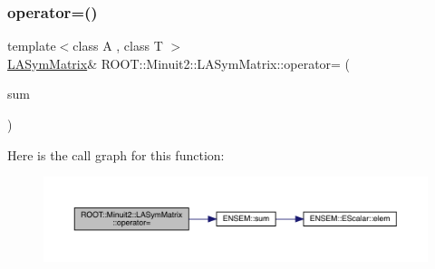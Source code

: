 \subsubsection{\texorpdfstring{operator=()}{operator=()}\hspace{0.1cm}{\footnotesize\ttfamily [9/14]}}
{\footnotesize\ttfamily template$<$class A , class T $>$ \\
\mbox{\hyperlink{classROOT_1_1Minuit2_1_1LASymMatrix}{L\+A\+Sym\+Matrix}}\& R\+O\+O\+T\+::\+Minuit2\+::\+L\+A\+Sym\+Matrix\+::operator= (\begin{DoxyParamCaption}\item[{const \mbox{\hyperlink{classROOT_1_1Minuit2_1_1ABObj}{A\+B\+Obj}}$<$ \mbox{\hyperlink{classROOT_1_1Minuit2_1_1sym}{sym}}, \mbox{\hyperlink{classROOT_1_1Minuit2_1_1ABSum}{A\+B\+Sum}}$<$ \mbox{\hyperlink{classROOT_1_1Minuit2_1_1ABObj}{A\+B\+Obj}}$<$ \mbox{\hyperlink{classROOT_1_1Minuit2_1_1sym}{sym}}, \mbox{\hyperlink{classROOT_1_1Minuit2_1_1LASymMatrix}{L\+A\+Sym\+Matrix}}, T $>$, \mbox{\hyperlink{classROOT_1_1Minuit2_1_1ABObj}{A\+B\+Obj}}$<$ \mbox{\hyperlink{classROOT_1_1Minuit2_1_1sym}{sym}}, A, T $>$ $>$, T $>$ \&}]{sum }\end{DoxyParamCaption})\hspace{0.3cm}{\ttfamily [inline]}}

Here is the call graph for this function\+:
\nopagebreak
\begin{figure}[H]
\begin{center}
\leavevmode
\includegraphics[width=350pt]{d3/d72/classROOT_1_1Minuit2_1_1LASymMatrix_abaf8a2feeb04c66aca17e5876dd7aaff_cgraph}
\end{center}
\end{figure}
\mbox{\label{classROOT_1_1Minuit2_1_1LASymMatrix_abaf8a2feeb04c66aca17e5876dd7aaff}} 
